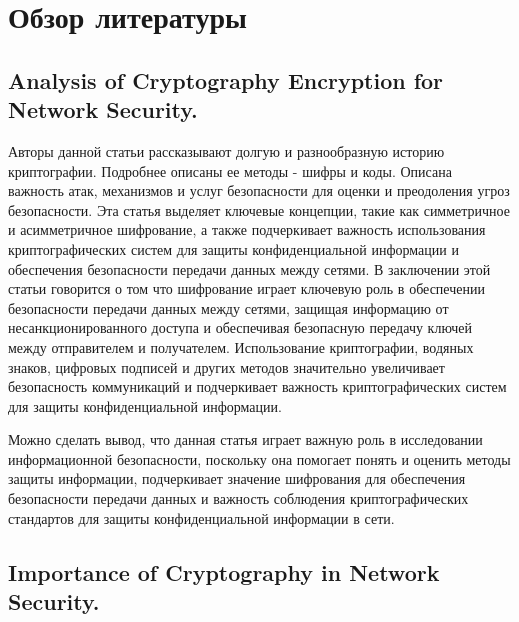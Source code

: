 \documentclass[14pt]{extarticle}
\begin{document}
\section{Обзор литературы}

\subsection{Analysis of Cryptography Encryption for Network Security.\cite{Article1}}

Авторы данной статьи рассказывают долгую и разнообразную историю криптографии. Подробнее описаны ее методы - шифры и коды. Описана важность атак, механизмов и услуг безопасности для оценки и преодоления угроз безопасности. Эта статья выделяет ключевые концепции, такие как симметричное и асимметричное шифрование, а также подчеркивает важность использования криптографических систем для защиты конфиденциальной информации и обеспечения безопасности передачи данных между сетями. В заключении этой статьи говорится о том что шифрование играет ключевую роль в обеспечении безопасности передачи данных между сетями, защищая информацию от несанкционированного доступа и обеспечивая безопасную передачу ключей между отправителем и получателем. Использование криптографии, водяных знаков, цифровых подписей и других методов значительно увеличивает безопасность коммуникаций и подчеркивает важность криптографических систем для защиты конфиденциальной информации. 

Можно сделать вывод, что данная статья играет важную роль в исследовании информационной безопасности, поскольку она помогает понять и оценить методы защиты информации, подчеркивает значение шифрования для обеспечения безопасности передачи данных и важность соблюдения криптографических стандартов для защиты конфиденциальной информации в сети. 

\subsection{Importance of Cryptography in Network Security.\cite{Article2}}
\end{document}
